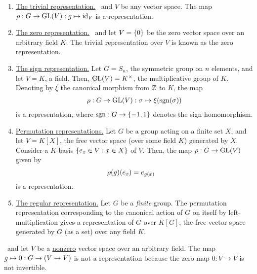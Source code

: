 \begin{boxexample}
    \hfill
    \begin{enumerate}
        \item \underline{The trivial representation.} \ and $V$ be any vector space. The map $\rho : G \to \operatorname{GL}\!\left( V \right) : g \mapsto \operatorname{id}_{V}$ is a representation.
        
        \item \underline{The zero representation.} \ and let $V = \left\{ 0 \right\}$ be the zero vector space over an arbitrary field $K$. The trivial representation over $V$ is known as the zero representation.
        
        \item \underline{The sign representation.} Let $G = S_n$, the symmetric group on $n$ elements, and let $V = K$, a field. Then, $\operatorname{GL}\!\left( V \right) = K^{\times}$, the multiplicative group of $K$. Denoting by $\xi$ the canonical morphism from $\mathbb{Z}$ to $K$, the map
        \begin{align*}
            \rho : G \to \operatorname{GL}\!\left( V \right) : \sigma \mapsto \xi\!\left( \operatorname{sgn}\!\left( \sigma \right) \right)
        \end{align*}
        is a representation, where $\operatorname{sgn} : G \to \left\{ -1,1 \right\}$ denotes the sign homomorphism.

        \item \underline{Permutation representations.} Let $G$ be a group acting on a finite set $X$, and let $V = K[X]$, the free vector space (over some field $K$) generated by $X$. Consider a $K$-basis $\left\{ e_x \in V : x \in X \right\}$ of $V$. Then, the map $\rho : G \to \operatorname{GL}\!\left( V \right)$ given by
        \begin{align*}
            \rho\!\left( g \right)\!\left( e_x \right) &= e_{g(x)}
        \end{align*}
        is a representation.

        \item \underline{The regular representation.} Let $G$ be a \textit{finite} group. The permutation representation corresponding to the canonical action of $G$ on itself by left-multiplication gives a representation of $G$ over $K[G]$, the free vector space generated by $G$ (as a set) over any field $K$.
    \end{enumerate}
\end{boxexample}

\begin{boxnexample}
    \ and let $V$ be a \underline{nonzero} vector space over an arbitrary field. The map $g \mapsto 0 : G \to \left( V \to V \right)$ is not a representation because the zero map $0 : V \to V$ is not invertible.
\end{boxnexample}

